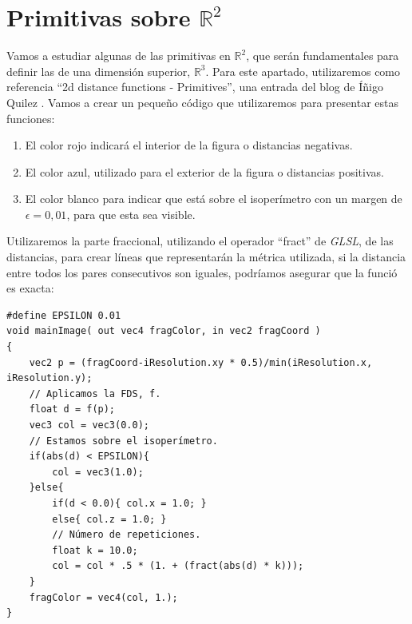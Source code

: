 \section{Primitivas sobre \(\mathbb{R}^2\)}
Vamos a estudiar algunas de las primitivas en \(\mathbb{R}^2\), que serán fundamentales para definir las de una dimensión superior, \(\mathbb{R}^3\). Para este apartado, utilizaremos como referencia \enquote{2d distance functions - Primitives}, una entrada del blog de Íñigo Quilez \cite{2ddistinigo}. Vamos a crear un pequeño código que utilizaremos para presentar estas funciones:
\begin{enumerate}
    \item El color rojo indicará el interior de la figura o distancias negativas.
    \item El color azul, utilizado para el exterior de la figura o distancias positivas.
    \item El color blanco para indicar que está sobre el isoperímetro con un margen de \(\epsilon=0,01\), para que esta sea visible.
\end{enumerate}
Utilizaremos la parte fraccional, utilizando el operador \enquote{fract} de \textit{GLSL}, de las distancias, para crear líneas que representarán la métrica utilizada, si la distancia entre todos los pares consecutivos son iguales, podríamos asegurar que la funció es exacta:
\begin{lstlisting}
#define EPSILON 0.01
void mainImage( out vec4 fragColor, in vec2 fragCoord )
{
    vec2 p = (fragCoord-iResolution.xy * 0.5)/min(iResolution.x, iResolution.y);
    // Aplicamos la FDS, f.
    float d = f(p);
    vec3 col = vec3(0.0);
    // Estamos sobre el isoperímetro.
    if(abs(d) < EPSILON){
        col = vec3(1.0);
    }else{
        if(d < 0.0){ col.x = 1.0; }
        else{ col.z = 1.0; }
    	// Número de repeticiones.
        float k = 10.0;
        col = col * .5 * (1. + (fract(abs(d) * k)));
    }
    fragColor = vec4(col, 1.);
}
\end{lstlisting}

